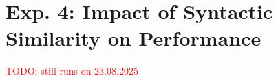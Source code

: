 \section{Exp. 4: Impact of Syntactic Similarity on \impApprTitle{} Performance}
\label{sec:res_syn_sim_impact}

\textcolor{red}{TODO: still runs on 23.08.2025}

%     

%     

%     

%     

%     

%     
